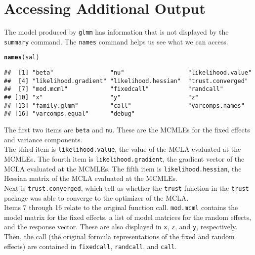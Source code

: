 \documentclass[11pt]{article}\usepackage[]{graphicx}\usepackage[]{color}
\makeatletter
\newcommand{\hlstd}[1]{\textcolor[rgb]{0.345,0.345,0.345}{#1}}%
\newcommand{\hlkwd}[1]{\textcolor[rgb]{0.737,0.353,0.396}{\textbf{#1}}}%
\newenvironment{kframe}{%
 \def\at@end@of@kframe{}%
 \ifinner\ifhmode%
  \def\at@end@of@kframe{\end{minipage}}%
  \begin{minipage}{\columnwidth}%
 \fi\fi%
 \def\FrameCommand##1{\hskip\@totalleftmargin \hskip-\fboxsep
 \colorbox{shadecolor}{##1}\hskip-\fboxsep
     \hskip-\linewidth \hskip-\@totalleftmargin \hskip\columnwidth}%
 \MakeFramed {\advance\hsize-\width
   \@totalleftmargin\z@ \linewidth\hsize
   \@setminipage}}%
 {\par\unskip\endMakeFramed%
 \at@end@of@kframe}
\newenvironment{knitrout}{}{} %
\makeatother
\begin{document}
\section{Accessing Additional Output}\label{sec:otherstuff}
The model produced by \texttt{glmm} has information that is not displayed by the \texttt{summary} command. The \texttt{names} command helps us see what we can access.\\
\begin{knitrout}
\color{fgcolor}\begin{kframe}
\begin{alltt}
\hlkwd{names}\hlstd{(sal)}
\end{alltt}
\begin{verbatim}
##  [1] "beta"                "nu"                  "likelihood.value"   
##  [4] "likelihood.gradient" "likelihood.hessian"  "trust.converged"    
##  [7] "mod.mcml"            "fixedcall"           "randcall"           
## [10] "x"                   "y"                   "z"                  
## [13] "family.glmm"         "call"                "varcomps.names"     
## [16] "varcomps.equal"      "debug"
\end{verbatim}
\end{kframe}
\end{knitrout}
The first two items are \texttt{beta} and \texttt{nu}. These are the MCMLEs for the fixed effects and variance components. \\

The third item is \texttt{likelihood.value}, the value of the MCLA evaluated at the MCMLEs. The fourth item is  \texttt{likelihood.gradient}, the gradient vector of the MCLA evaluated at the MCMLEs.  The fifth item is  \texttt{likelihood.hessian}, the Hessian matrix of the MCLA evaluated at the MCMLEs.\\

Next is \texttt{trust.converged}, which tell us whether the \texttt{trust} function in the \texttt{trust} package was able to converge to the optimizer of the MCLA.\\

Items 7 through 16 relate to the original function call. \texttt{mod.mcml} contains the model matrix for the fixed effects, a list of model matrices for the random effects, and the response vector. These are also displayed in \texttt{x}, \texttt{z}, and \texttt{y}, respectively. Then, the call (the original formula representations of the fixed and random effects) are contained in \texttt{fixedcall}, \texttt{randcall}, and \texttt{call}.\\
\end{document}
